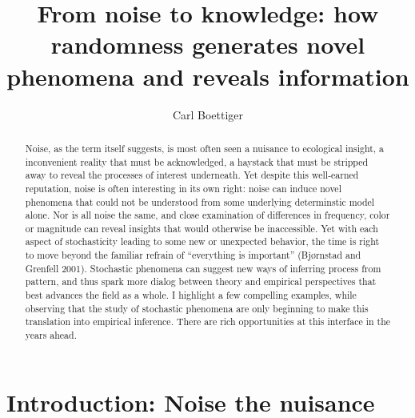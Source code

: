 \documentclass[3p]{elsarticle} %
\begin{document}
\begin{frontmatter}

  \title{From noise to knowledge: how randomness generates novel phenomena and
reveals information}
    \author[a]{Carl Boettiger}
  
      \address[a]{Dept of Environmental Science, Policy, and Management, University of
California Berkeley, Berkeley CA 94720-3114, USA}
  
  \begin{abstract}
  Noise, as the term itself suggests, is most often seen a nuisance to
  ecological insight, a inconvenient reality that must be acknowledged, a
  haystack that must be stripped away to reveal the processes of interest
  underneath. Yet despite this well-earned reputation, noise is often
  interesting in its own right: noise can induce novel phenomena that
  could not be understood from some underlying determinstic model alone.
  Nor is all noise the same, and close examination of differences in
  frequency, color or magnitude can reveal insights that would otherwise
  be inaccessible. Yet with each aspect of stochasticity leading to some
  new or unexpected behavior, the time is right to move beyond the
  familiar refrain of ``everything is important'' (Bjørnstad and Grenfell
  2001). Stochastic phenomena can suggest new ways of inferring process
  from pattern, and thus spark more dialog between theory and empirical
  perspectives that best advances the field as a whole. I highlight a few
  compelling examples, while observing that the study of stochastic
  phenomena are only beginning to make this translation into empirical
  inference. There are rich opportunities at this interface in the years
  ahead.\\
  \end{abstract}
  
 \end{frontmatter}

\newpage

\hypertarget{introduction-noise-the-nuisance}{%
\section{Introduction: Noise the
nuisance}\label{introduction-noise-the-nuisance}}
\end{document}
